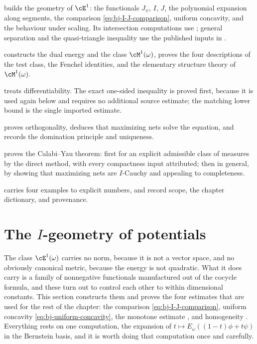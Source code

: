  builds the geometry of $\cE^1$: the functionals
$J_\psi$, $I$, $J$, the polynomial expansion along segments, the
comparison \eqref{eq:bj-I-J-comparison}, uniform concavity, and the
behaviour under scaling. Its intersection computations use
; general separation and the quasi-triangle
inequality use the published inputs in .

 constructs the dual energy and the class
$\cM^1(\omega)$, proves the four descriptions of the test class, the
Fenchel identities, and the elementary structure theory of
$\cM^1(\omega)$.

 treats differentiability.  The exact
one-sided inequality  is proved first,
because it is used again below and requires no additional source estimate; the
matching lower bound is the single imported estimate.

 proves orthogonality, deduces that
maximizing nets solve the equation, and records the domination principle
and uniqueness.

 proves the Calabi--Yau theorem: first for an explicit
admissible class of measures by the direct method, with every compactness
input attributed; then in general, by showing that maximizing nets are
$I$-Cauchy and appealing to completeness.

 carries four examples to explicit numbers, and
 record scope, the chapter
dictionary, and provenance.

\section{The \texorpdfstring{$I$}{I}-geometry of potentials}
\label{sec:ch47-geometry}

The class $\cE^1(\omega)$ carries no norm, because it is not a vector
space, and no obviously canonical metric, because the energy is not
quadratic.  What it does carry is a family of nonnegative functionals
manufactured out of the cocycle formula, and these turn out to control each
other to within dimensional constants.  This section constructs them and
proves the four estimates that are used for the rest of the chapter: the
comparison \eqref{eq:bj-I-J-comparison}, uniform concavity
\eqref{eq:bj-uniform-concavity}, the monotone estimate
, and homogeneity
.  Everything rests on one computation, the
expansion of $t\mapsto E_\omega((1-t)\phi+t\psi)$ in the Bernstein basis,
and it is worth doing that computation once and carefully.

